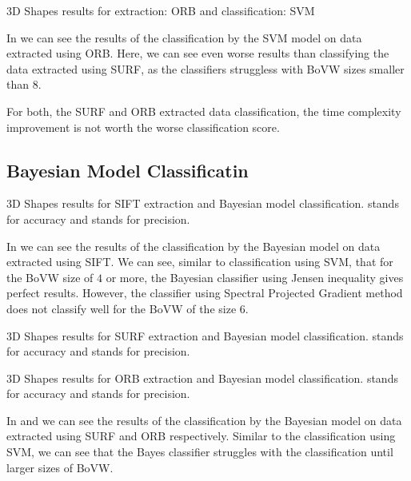 \begin{table}[ht!]
    \centering
    
    \caption{3D Shapes results for extraction: ORB and classification: SVM}
    \label{tab:3d_ORB_SVM}
\end{table}
In  we can see the results of the classification by the SVM model on data extracted using ORB. Here, we can see even worse results than classifying the data extracted using SURF, as the classifiers struggless with BoVW sizes smaller than $8$.

For both, the SURF and ORB extracted data classification, the time complexity improvement is not worth the worse classification score.

\subsection{Bayesian Model Classificatin}
\begin{table}[ht!]
    \centering
    
    \caption[3D Shapes results for SIFT extraction and Bayesian model classification]{3D Shapes results for SIFT extraction and Bayesian model classification.  stands for accuracy and  stands for precision.}
    \label{tab:3d_SIFT_bayes}
\end{table}
In  we can see the results of the classification by the Bayesian model on data extracted using SIFT. We can see, similar to classification using SVM, that for the BoVW size of $4$ or more, the Bayesian classifier using Jensen inequality gives perfect results. However, the classifier using Spectral Projected Gradient method does not classify well for the BoVW of the size $6$.

\begin{table}[ht!]
    \centering
    
    \caption[3D Shapes results for SURF extraction and Bayesian model classification]{3D Shapes results for SURF extraction and Bayesian model classification.  stands for accuracy and  stands for precision.}
    \label{tab:3d_SURF_bayes}
\end{table}
\begin{table}[ht!]
    \centering
    
    \caption[3D Shapes results for ORB extraction and Bayesian model classification]{3D Shapes results for ORB extraction and Bayesian model classification.  stands for accuracy and  stands for precision.}
    \label{tab:3d_ORB_bayes}
\end{table}
In  and  we can see the results of the classification by the Bayesian model on data extracted using SURF and ORB respectively. Similar to the classification using SVM, we can see that the Bayes classifier struggles with the classification until larger sizes of BoVW.

